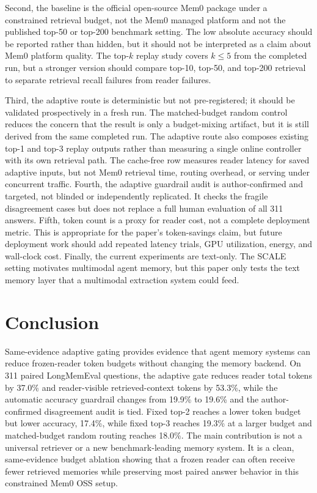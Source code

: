\documentclass{article}
\begin{document}
Second, the baseline is the official open-source Mem0 package under a constrained retrieval budget, not the Mem0 managed platform and not the published top-50 or top-200 benchmark setting. The low absolute accuracy should be reported rather than hidden, but it should not be interpreted as a claim about Mem0 platform quality. The top-$k$ replay study covers $k \le 5$ from the completed run, but a stronger version should compare top-10, top-50, and top-200 retrieval to separate retrieval recall failures from reader failures.

Third, the adaptive route is deterministic but not pre-registered; it should be validated prospectively in a fresh run. The matched-budget random control reduces the concern that the result is only a budget-mixing artifact, but it is still derived from the same completed run. The adaptive route also composes existing top-1 and top-3 replay outputs rather than measuring a single online controller with its own retrieval path. The cache-free row measures reader latency for saved adaptive inputs, but not Mem0 retrieval time, routing overhead, or serving under concurrent traffic. Fourth, the adaptive guardrail audit is author-confirmed and targeted, not blinded or independently replicated. It checks the fragile disagreement cases but does not replace a full human evaluation of all 311 answers. Fifth, token count is a proxy for reader cost, not a complete deployment metric. This is appropriate for the paper's token-savings claim, but future deployment work should add repeated latency trials, GPU utilization, energy, and wall-clock cost. Finally, the current experiments are text-only. The SCALE setting motivates multimodal agent memory, but this paper only tests the text memory layer that a multimodal extraction system could feed.

\section{Conclusion}

Same-evidence adaptive gating provides evidence that agent memory systems can reduce frozen-reader token budgets without changing the memory backend. On 311 paired LongMemEval questions, the adaptive gate reduces reader total tokens by 37.0\% and reader-visible retrieved-context tokens by 53.3\%, while the automatic accuracy guardrail changes from 19.9\% to 19.6\% and the author-confirmed disagreement audit is tied. Fixed top-2 reaches a lower token budget but lower accuracy, 17.4\%, while fixed top-3 reaches 19.3\% at a larger budget and matched-budget random routing reaches 18.0\%. The main contribution is not a universal retriever or a new benchmark-leading memory system. It is a clean, same-evidence budget ablation showing that a frozen reader can often receive fewer retrieved memories while preserving most paired answer behavior in this constrained Mem0 OSS setup.
\end{document}
